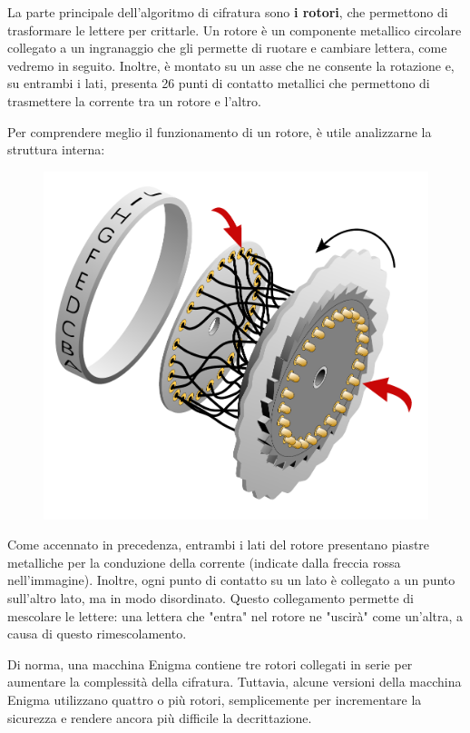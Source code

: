 \documentclass{rapport}
\begin{document}
La parte principale dell'algoritmo di cifratura sono \textbf{i rotori}, che permettono di trasformare le lettere per crittarle.  
Un rotore è un componente metallico circolare collegato a un ingranaggio che gli permette di ruotare e cambiare lettera, come vedremo in seguito.  
Inoltre, è montato su un asse che ne consente la rotazione e, su entrambi i lati, presenta 26 punti di contatto metallici che permettono di trasmettere la corrente tra un rotore e l'altro.

\afterpage{\clearpage}   


\newpage
Per comprendere meglio il funzionamento di un rotore, è utile analizzarne la struttura interna:

\begin{figure}[h]
    \centering
    \includegraphics[width=0.6\linewidth]{logos/Mediamodifier-Design-ritagliato.pdf}
\end{figure}

Come accennato in precedenza, entrambi i lati del rotore presentano piastre metalliche per la conduzione della corrente (indicate dalla freccia rossa nell'immagine). Inoltre, ogni punto di contatto su un lato è collegato a un punto sull'altro lato, ma in modo disordinato. Questo collegamento permette di mescolare le lettere: una lettera che "entra" nel rotore ne "uscirà" come un'altra, a causa di questo rimescolamento.  

Di norma, una macchina Enigma contiene tre rotori collegati in serie per aumentare la complessità della cifratura. Tuttavia, alcune versioni della macchina Enigma utilizzano quattro o più rotori, semplicemente per incrementare la sicurezza e rendere ancora più difficile la decrittazione.
\end{document}
